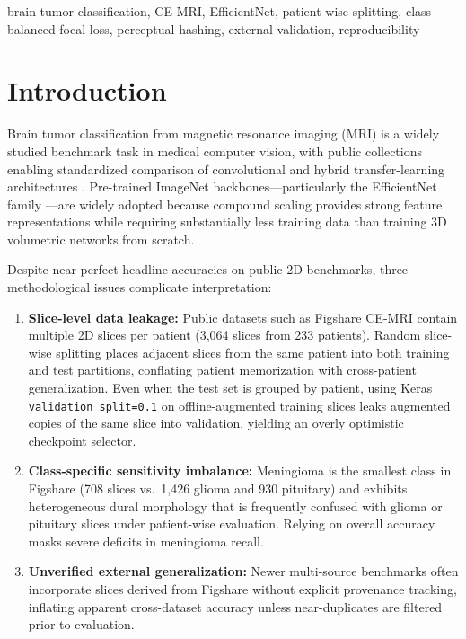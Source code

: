 \documentclass[conference]{IEEEtran}
\begin{document}
\begin{IEEEkeywords}
brain tumor classification, CE-MRI, EfficientNet, patient-wise splitting, class-balanced focal loss, perceptual hashing, external validation, reproducibility
\end{IEEEkeywords}

\section{Introduction}
Brain tumor classification from magnetic resonance imaging (MRI) is a widely studied benchmark task in medical computer vision, with public collections enabling standardized comparison of convolutional and hybrid transfer-learning architectures \cite{cheng2015enhanced,zulfiqar2023efficientnet}. Pre-trained ImageNet backbones—particularly the EfficientNet family \cite{tan2019efficientnet}—are widely adopted because compound scaling provides strong feature representations while requiring substantially less training data than training 3D volumetric networks from scratch.

Despite near-perfect headline accuracies on public 2D benchmarks, three methodological issues complicate interpretation:
\begin{enumerate}
    \item \textbf{Slice-level data leakage:} Public datasets such as Figshare CE-MRI contain multiple 2D slices per patient (3,064 slices from 233 patients). Random slice-wise splitting places adjacent slices from the same patient into both training and test partitions, conflating patient memorization with cross-patient generalization. Even when the test set is grouped by patient, using Keras \texttt{validation\_split=0.1} on offline-augmented training slices leaks augmented copies of the same slice into validation, yielding an overly optimistic checkpoint selector.
    \item \textbf{Class-specific sensitivity imbalance:} Meningioma is the smallest class in Figshare (708 slices vs.\ 1,426 glioma and 930 pituitary) and exhibits heterogeneous dural morphology that is frequently confused with glioma or pituitary slices under patient-wise evaluation. Relying on overall accuracy masks severe deficits in meningioma recall.
    \item \textbf{Unverified external generalization:} Newer multi-source benchmarks often incorporate slices derived from Figshare without explicit provenance tracking, inflating apparent cross-dataset accuracy unless near-duplicates are filtered prior to evaluation.
\end{enumerate}
\end{document}
